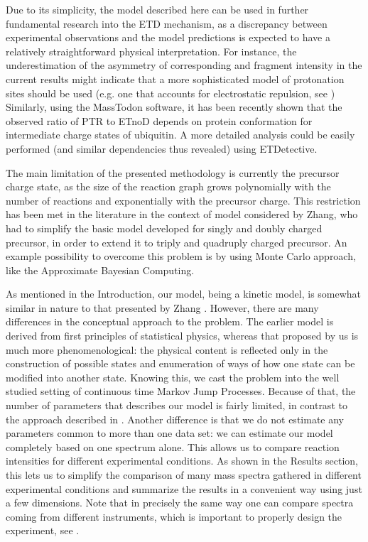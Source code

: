 \documentclass{llncs}
\begin{document}
        Due to its simplicity, the model described here can be used in further fundamental research into the ETD mechanism, as a discrepancy between experimental observations and the model predictions is expected to have a relatively straightforward physical interpretation. For instance, the underestimation of the asymmetry of corresponding  and  fragment intensity in the current results might indicate that a more sophisticated model of protonation sites should be used (e.g. one that accounts for electrostatic repulsion, see \cite{Morrison2016-wc}) Similarly, using the MassTodon software, it has been recently shown \cite{Lermyte2017-zt} that the observed ratio of PTR to ETnoD depends on protein conformation for intermediate charge states of ubiquitin. A more detailed  analysis could be easily performed (and similar dependencies thus revealed) using ETDetective.

        The main limitation of the presented methodology is currently the precursor charge state, as the size of the reaction graph grows polynomially  with the number of reactions and exponentially with the precursor charge. This restriction has been met in the literature in the context of model considered by Zhang, who had to simplify the basic model developed for singly and doubly charged precursor, in order to extend it to triply and quadruply charged precursor. An example possibility to overcome this problem is by using Monte Carlo approach, like the Approximate Bayesian Computing.

        As mentioned in the Introduction, our model, being a kinetic model, is somewhat similar in nature to that presented by Zhang \cite{Zhang2010-fp}. However, there are many differences in the conceptual approach to the problem. The earlier model is derived from first principles of statistical physics, whereas that proposed by us is much more phenomenological: the physical content is reflected only in the construction of possible states and enumeration of ways of how one state can be modified into another state. Knowing this, we cast the problem into the well studied setting of continuous time Markov Jump Processes. Because of that, the number of parameters that describes our model is fairly limited, in contrast to the approach described in  \cite{Zhang2010-fp}. Another difference is that we do not estimate any parameters common to more than one data set: we can estimate our model completely based on one spectrum alone. This allows us to compare reaction intensities for different experimental conditions. As shown in the Results section, this lets us to simplify the comparison of many mass spectra gathered in different experimental conditions and summarize the results in a convenient way using just a few dimensions. Note that in precisely the same way one can compare spectra coming from different instruments, which is important to properly design the experiment, see \cite{Lermyte2015-lm}.
\end{document}

